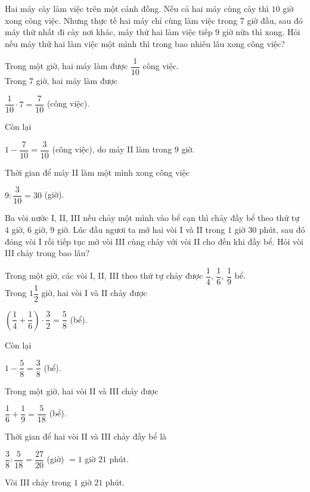 \begin{bt}%
	Hai máy cày làm việc trên một cánh đồng. Nếu cả hai máy cùng cày thì $10$ giờ xong công việc. Nhưng thực tế hai máy chỉ cùng làm việc trong $7$ giờ đầu, sau đó máy thứ nhất đi cày nơi khác, máy thứ hai làm việc tiếp $9$ giờ nữa thì xong. Hỏi nếu máy thứ hai làm việc một mình thì trong bao nhiêu lâu xong công việc?
	\loigiai
	{
		Trong một giờ, hai máy làm được $\dfrac{1}{10}$ công việc. \\
		Trong $7$ giờ, hai máy làm được 
		\begin{center}
			$\dfrac{1}{10}\cdot 7=\dfrac{7}{10}$ (công việc).
		\end{center}
		Còn lại
		\begin{center}
			$1-\dfrac{7}{10}=\dfrac{3}{10}$ (công việc), do máy II làm trong $9$ giờ.
		\end{center}
		Thời gian để máy II làm một mình xong công việc 
		\begin{center}
			$9:\dfrac{3}{10}=30$ (giờ).
		\end{center}
	}
\end{bt}
\begin{bt}%
	Ba vòi nước I, II, III nếu chảy một mình vào bể cạn thì chảy đầy bể theo thứ tự $4$ giờ, $6$ giờ, $9$ giờ. Lúc đầu ngươi ta mở hai vòi I và II trong $1$ giờ $30$ phút, sau đó đóng vòi I rồi tiếp tục mở vòi III cùng chảy với vòi II cho đến khi đầy bể. Hỏi vòi III chảy trong bao lâu?
	\loigiai
	{
		Trong một giờ, các vòi I, II, III theo thứ tự chảy được $\dfrac{1}{4}$, $\dfrac{1}{6}$, $\dfrac{1}{9}$ bể.\\
		Trong $1\dfrac{1}{2}$ giờ, hai vòi I và II chảy được
		\begin{center}
			$\left(\dfrac{1}{4}+\dfrac{1}{6}\right)\cdot \dfrac{3}{2}=\dfrac{5}{8}$ (bể).
		\end{center}
		Còn lại
		\begin{center}
			$1-\dfrac{5}{8}=\dfrac{3}{8}$ (bể).
		\end{center}
		Trong một giờ, hai vòi II và III chảy được
		\begin{center}
			$\dfrac{1}{6}+\dfrac{1}{9}=\dfrac{5}{18}$ (bể).
		\end{center}
		Thời gian để hai vòi II và III chảy đầy bể là
		\begin{center}
			$\dfrac{3}{8}:\dfrac{5}{18}=\dfrac{27}{20}$ (giờ) $=1$ giờ $21$ phút.
		\end{center}
		Vòi III chảy trong $1$ giờ $21$ phút.
	}
\end{bt}
